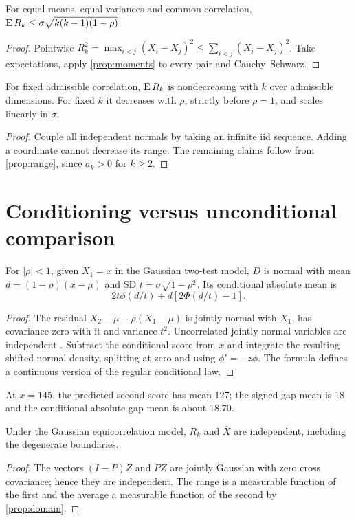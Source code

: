 \begin{proposition}\label{prop:bound}
For equal means, equal variances and common correlation,
$\operatorname{E} R_k\le\sigma\sqrt{k(k-1)(1-\rho)}$.
\end{proposition}
\begin{proof}
Pointwise $R_k^2=\max_{i<j}(X_i-X_j)^2\le
\sum_{i<j}(X_i-X_j)^2$. Take expectations, apply
\cref{prop:moments} to every pair and Cauchy--Schwarz.
\end{proof}
\begin{proposition}[Sensitivity]\label{prop:sensitivity}
For fixed admissible correlation, $\operatorname{E} R_k$ is nondecreasing with
$k$ over admissible dimensions. For fixed $k$ it decreases with $\rho$,
strictly before $\rho=1$, and scales linearly in $\sigma$.
\end{proposition}
\begin{proof}
Couple all independent normals by taking an infinite iid sequence.
Adding a coordinate cannot decrease its range. The remaining claims
follow from \cref{prop:range}, since $a_k>0$ for $k\ge2$.
\end{proof}
\chapter{Conditioning versus unconditional comparison}
\begin{proposition}\label{prop:conditional}
For $|\rho|<1$, given $X_1=x$ in the Gaussian two-test model,
$D$ is normal with mean $d=(1-\rho)(x-\mu)$ and SD
$t=\sigma\sqrt{1-\rho^2}$. Its conditional absolute mean is
\[
2t\phi(d/t)+d[2\Phi(d/t)-1].
\]
\end{proposition}
\begin{proof}
The residual $X_2-\mu-\rho(X_1-\mu)$ is jointly normal with $X_1$,
has covariance zero with it and variance $t^2$. Uncorrelated jointly
normal variables are independent \citep{anderson}. Subtract the
conditional score from $x$ and integrate the resulting shifted normal
density, splitting at zero and using $\phi'=-z\phi$.
The formula defines a continuous version of the regular conditional law.
\end{proof}
At $x=145$, the predicted second score has mean 127; the signed gap
mean is 18 and the conditional absolute gap mean is about 18.70.
\begin{proposition}\label{prop:average}
Under the Gaussian equicorrelation model, $R_k$ and $\bar X$ are independent, including the degenerate boundaries.
\end{proposition}
\begin{proof}
The vectors $(I-P)Z$ and $PZ$ are jointly Gaussian with zero cross
covariance; hence they are independent. The range is a measurable
function of the first and the average a measurable function of the
second by \cref{prop:domain}.
\end{proof}
